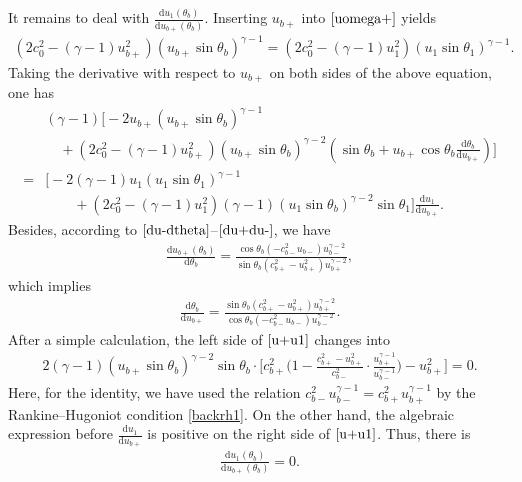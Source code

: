 \documentclass[10pt,a4paper]{amsart}
\newcommand{\dd}{\mathrm{d}}
\numberwithin{equation}{section}
\begin{document}
It remains to deal with $\frac{\dd u_1(\theta_b)}{\dd u_{b+}(\theta_b)}$. Inserting $u_{b+}$ into $\eqref{uomega+}$ yields
	\begin{align*}
		(2c^2_0-(\gamma-1)u^2_{b+})(u_{b+}\sin\theta_b)^{\gamma-1}=(2c^2_0-(\gamma-1)u^2_1)(u_1\sin\theta_1)^{\gamma-1}.
	\end{align*}
Taking the derivative with respect to $u_{b+}$ on both sides of the above equation, one has
	\begin{align}
		&(\gamma-1)\Big[-2u_{b+}(u_{b+}\sin\theta_b)^{\gamma-1}\nonumber\\
		&\quad+(2c_0^2-(\gamma-1)u_{b+}^2)(u_{b+}\sin\theta_b)^{\gamma-2}
	(\sin\theta_b+u_{b+}\cos\theta_b\frac{\dd \theta_b}{\dd u_{b+}})\Big]\nonumber\\
		=&\Big[-2(\gamma-1)u_1(u_1\sin\theta_1)^{\gamma-1}\nonumber\\
		&\qquad+(2c_0^2-(\gamma-1)u_1^2)(\gamma-1)(u_1\sin\theta_b)^{\gamma-2}\sin\theta_1 \Big]\frac{\dd u_1}{\dd u_{b+}}.\label{u+u1}
	\end{align}
Besides, according to $\eqref{du-dtheta}$--$\eqref{du+du-}$, we have
	\begin{align*}
		\frac{\dd u_{b+}(\theta_b)}{\dd \theta_b}=\frac{\cos\theta_b(-c^2_{b-}u_{b-})u^{\gamma-2}_{b-}}{\sin\theta_b(c^2_{b+}-u^2_{b+})u^{\gamma-2}_{b+}},
	\end{align*}
which implies
	\begin{align*}
		\frac{\dd \theta_b}{\dd u_{b+}}=\frac{\sin\theta_b(c^2_{b+}-u^2_{b+})u^{\gamma-2}_{b+}}{\cos\theta_b(-c^2_{b-}u_{b-})u^{\gamma-2}_{b-}}.
	\end{align*}	
After a simple calculation, the left side of $\eqref{u+u1}$ changes into 
		\begin{align}\label{*}
		2(\gamma-1)(u_{b+}\sin\theta_b)^{\gamma-2}\sin\theta_b\cdot\Big[c^2_{b+}\big(1-\frac{c^2_{b+}-u^2_{b+}}{c^2_{b-}}\cdot\frac{u^{\gamma-1}_{b+}}{u^{\gamma-1}_{b-}}\big)-u^2_{b+}\Big]=0.
	\end{align}
Here, for the identity, we have used the relation $c_{b-}^2u_{b-}^{\gamma-1}=c_{b+}^2u_{b+}^{\gamma-1}$ by the Rankine–Hugoniot condition \eqref{backrh1}. On the other hand, the algebraic expression before $\frac{\dd u_1}{\dd u_{b+}}$ is positive on the right side of $\eqref{u+u1}$. Thus, there is
	\begin{align}\label{du1dub+}
	\frac{\dd u_1(\theta_b)}{\dd u_{b+}(\theta_b) }=0.
	\end{align}
\end{document}
